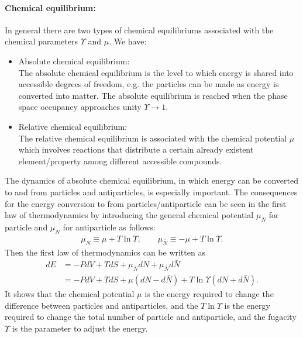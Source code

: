 {\paragraph{Chemical equilibrium:}
In general there are two types of chemical equilibriums associated with the chemical parameters $\Upsilon$ and $\mu$. We have:
\begin{itemize}
\item Absolute chemical equilibrium:\\
The absolute chemical equilibrium is the level to which energy is shared into accessible degrees of freedom, e.g. the particles can be made as energy is converted into matter.
The absolute equilibrium is reached when the phase space occupancy approaches unity $\Upsilon\to1$. 
 \item Relative chemical equilibrium:\\
 The relative chemical equilibrium is associated with the chemical potential $\mu$ which involves reactions that distribute a certain already existent element/property among different accessible compounds. 
 \end{itemize}
The dynamics of absolute chemical equilibrium, in which energy can be converted to and from particles and antiparticles, is especially important. The consequences for the energy conversion to from particles/antiparticle can be seen in the first law of thermodynamics by introducing the general chemical potential $\mu_N$ for particle and $\mu_{\bar{N}}$ for antiparticle as follows:
\begin{align}
\mu_N\equiv\mu+T\ln\Upsilon,\qquad{\mu_{\bar{N}}}\equiv{-\mu}+T\ln\Upsilon.
\end{align}
Then the first law of thermodynamics can be written as
\begin{align}
dE&=-PdV+TdS+{\mu_N}dN+{\mu_{\bar{N}}}d{\bar{N}}
\\&=-PdV+TdS+{\mu}(dN-d{\bar{N}})+T\ln{\Upsilon}(dN+d{\bar{N}}).
\end{align}
It shows that the chemical potential $\mu$ is the energy required to change the difference between particles and antiparticles, and the $T\ln\Upsilon$ is the energy required to change the total number of particle and antiparticle, and the fugacity $\Upsilon$ is the parameter to adjust the energy.

}
